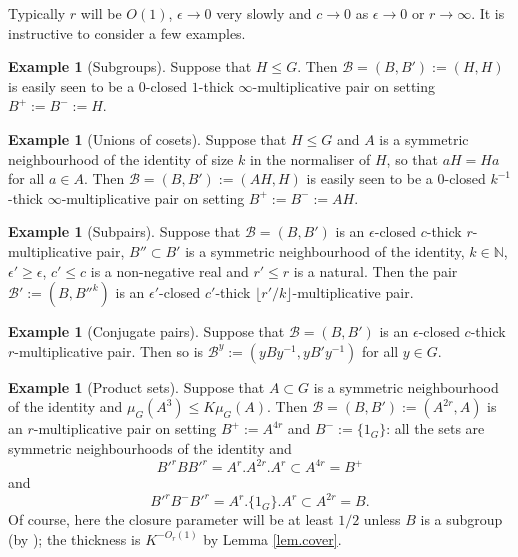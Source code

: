 \documentclass[12pt]{amsart}
\numberwithin{equation}{section}
\theoremstyle{plain}
\theoremstyle{definition}
\newtheorem{example}[subsection]{Example}
\renewcommand{\leq}{\leqslant}
\renewcommand{\geq}{\geqslant}
\newcommand{\N}{\mathbb{N}}
\begin{document}
Typically $r$ will be $O(1)$, $\epsilon\rightarrow 0$ very slowly and $c\rightarrow 0$ as $\epsilon \rightarrow 0$ or $r \rightarrow \infty$.   It is instructive to consider a few examples.
\begin{example}[Subgroups]  Suppose that $H \leq G$.  Then $\mathcal{B}=(B,B'):=(H,H)$ is easily seen to be a $0$-closed $1$-thick $\infty$-multiplicative pair on setting $B^+:=B^-:=H$.
\end{example}
\begin{example}[Unions of cosets]  Suppose that $H \leq G$ and $A$ is a symmetric neighbourhood of the identity of size $k$ in the normaliser of $H$, so that $aH=Ha$ for all $a \in A$. Then $\mathcal{B}=(B,B'):=(AH,H)$ is easily seen to be a $0$-closed $k^{-1}$-thick $\infty$-multiplicative pair on setting $B^+:=B^-:=AH$.
\end{example}
\begin{example}[Subpairs] Suppose that $\mathcal{B}=(B,B')$ is an $\epsilon$-closed $c$-thick $r$-multiplicative pair, $B'' \subset B'$ is a symmetric neighbourhood of the identity, $k \in \N$, $\epsilon' \geq \epsilon$, $c' \leq c$ is a non-negative real and $r' \leq r$ is a natural. Then the pair $\mathcal{B}':=(B,B''^k)$ is an $\epsilon'$-closed $c'$-thick $\lfloor r'/k\rfloor$-multiplicative pair.
\end{example}
\begin{example}[Conjugate pairs]
Suppose that $\mathcal{B}=(B,B')$ is an $\epsilon$-closed $c$-thick $r$-multiplicative pair.  Then so is $\mathcal{B}^y:=(yBy^{-1},yB'y^{-1})$ for all $y \in G$.
\end{example}
\begin{example}[Product sets]  Suppose that $A \subset G$ is a symmetric neighbourhood of the identity and $\mu_G(A^3) \leq K\mu_G(A)$.  Then $\mathcal{B}=(B,B'):=(A^{2r},A)$ is an $r$-multiplicative pair on setting $B^+:=A^{4r}$ and $B^-:=\{1_G\}$: all the sets are symmetric neighbourhoods of the identity and 
\begin{equation*}
B'^rBB'^r=A^r.A^{2r}.A^r \subset A^{4r}=B^+
\end{equation*}
and
\begin{equation*}
B'^rB^{-}B'^r = A^r.\{1_G\}.A^r \subset A^{2r}=B.
\end{equation*}
Of course, here the closure parameter will be at least $1/2$ unless $B$ is a subgroup (by \cite[Exercise 2.6.5]{TCTVHV}); the thickness is $K^{-O_r(1)}$ by Lemma \ref{lem.cover}.
\end{example}
\end{document}
